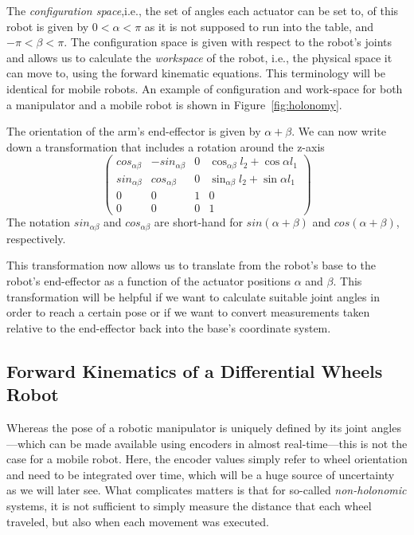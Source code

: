 The \emph{configuration space},i.e., the set of angles each actuator can be set to, of this robot is given by $ 0 < \alpha < \pi $ as it is not supposed to run into the table, and $ -\pi < \beta < \pi$. The configuration space is given with respect to the robot's joints and allows us to calculate the \emph{workspace} of the robot, i.e., the physical space it can move to, using the forward kinematic equations. This terminology will be identical for mobile robots. An example of configuration and work-space for both a manipulator and a mobile robot is shown in Figure~\ref{fig:holonomy}.

The orientation of the arm's end-effector is given by $\alpha+\beta$. We can now write down  a transformation that includes a rotation around the z-axis
\begin{equation}
\label{eq:2armtrans}
\left(\begin{array}{llll}cos_{\alpha\beta} & -sin_{\alpha\beta} &  0 & \cos_{\alpha\beta}l_2+\cos\alpha l_1\\
                        sin_{\alpha\beta} & cos_{\alpha\beta} & 0 & \sin_{\alpha\beta}l_2+\sin\alpha l_1\\
                                                0 & 0 & 1 & 0\\
                                                0 & 0 & 0 & 1\end{array}\right)
\end{equation}
The notation $sin_{\alpha\beta}$ and $cos_{\alpha\beta}$ are short-hand for $sin(\alpha+\beta)$ and $cos(\alpha+\beta)$, respectively.

This transformation now allows us to translate from the robot's base to the robot's end-effector as a function of the actuator positions $\alpha$ and $\beta$. This transformation will be helpful if we want to calculate suitable joint angles in order to reach a certain pose or if we want to convert measurements taken relative to the end-effector back into the base's coordinate system.

\subsection{Forward Kinematics of a Differential Wheels Robot}\label{sec:fwkmobile}
Whereas the pose of a robotic manipulator is uniquely defined by its joint angles---which can be made available using encoders in almost real-time---this is not the case for a mobile robot. Here, the encoder values simply refer to wheel orientation and need to be integrated over time, which will be a huge source of uncertainty as we will later see.
What complicates matters is that for so-called \emph{non-holonomic} systems, it is not sufficient to simply measure the distance that each wheel traveled, but also when each movement was executed.

